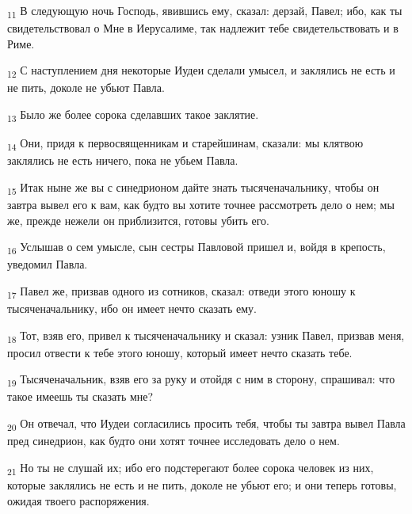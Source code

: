\begin{tcolorbox}
\textsubscript{11} В следующую ночь Господь, явившись ему, сказал: дерзай, Павел; ибо, как ты свидетельствовал о Мне в Иерусалиме, так надлежит тебе свидетельствовать и в Риме.
\end{tcolorbox}
\begin{tcolorbox}
\textsubscript{12} С наступлением дня некоторые Иудеи сделали умысел, и заклялись не есть и не пить, доколе не убьют Павла.
\end{tcolorbox}
\begin{tcolorbox}
\textsubscript{13} Было же более сорока сделавших такое заклятие.
\end{tcolorbox}
\begin{tcolorbox}
\textsubscript{14} Они, придя к первосвященникам и старейшинам, сказали: мы клятвою заклялись не есть ничего, пока не убьем Павла.
\end{tcolorbox}
\begin{tcolorbox}
\textsubscript{15} Итак ныне же вы с синедрионом дайте знать тысяченачальнику, чтобы он завтра вывел его к вам, как будто вы хотите точнее рассмотреть дело о нем; мы же, прежде нежели он приблизится, готовы убить его.
\end{tcolorbox}
\begin{tcolorbox}
\textsubscript{16} Услышав о сем умысле, сын сестры Павловой пришел и, войдя в крепость, уведомил Павла.
\end{tcolorbox}
\begin{tcolorbox}
\textsubscript{17} Павел же, призвав одного из сотников, сказал: отведи этого юношу к тысяченачальнику, ибо он имеет нечто сказать ему.
\end{tcolorbox}
\begin{tcolorbox}
\textsubscript{18} Тот, взяв его, привел к тысяченачальнику и сказал: узник Павел, призвав меня, просил отвести к тебе этого юношу, который имеет нечто сказать тебе.
\end{tcolorbox}
\begin{tcolorbox}
\textsubscript{19} Тысяченачальник, взяв его за руку и отойдя с ним в сторону, спрашивал: что такое имеешь ты сказать мне?
\end{tcolorbox}
\begin{tcolorbox}
\textsubscript{20} Он отвечал, что Иудеи согласились просить тебя, чтобы ты завтра вывел Павла пред синедрион, как будто они хотят точнее исследовать дело о нем.
\end{tcolorbox}
\begin{tcolorbox}
\textsubscript{21} Но ты не слушай их; ибо его подстерегают более сорока человек из них, которые заклялись не есть и не пить, доколе не убьют его; и они теперь готовы, ожидая твоего распоряжения.
\end{tcolorbox}
